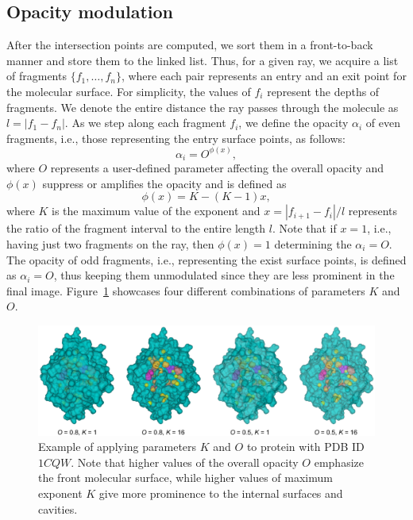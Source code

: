 \subsection{Opacity modulation}\label{sec:opacity}
After the intersection points are computed, we sort them in a front-to-back manner and store them to the linked list. 
Thus, for a given ray, we acquire a list of fragments $\{f_1,\ldots,f_n \}$, where each pair represents an entry and an exit point for the molecular surface. For simplicity, the values of $f_i$ represent the depths of fragments. 
We denote the entire distance the ray passes through the molecule as $l=|f_1-f_n|$. 
As we step along each fragment $f_i$, we define the opacity $\alpha_i$ of even fragments, i.e., those representing the entry surface points, as follows:
\begin{equation}
  \alpha_i = O^{\phi(x)},
	\label{eq:alphaDistEven}
\end{equation}	
where $O$ represents a user-defined parameter affecting the overall opacity and $\phi(x)$ suppress or amplifies the opacity and is defined as
\begin{equation}
  \phi(x) = K-(K-1)x,
	\label{eq:exponent}
\end{equation}	
where $K$ is the maximum value of the exponent and $x=|f_{i+1}-f_i|/l$ represents the ratio of the fragment interval to the entire length $l$. Note that if $x=1$, i.e., having just two fragments on the ray, then $\phi(x)=1$ determining the $\alpha_i=O$. The opacity of odd fragments, i.e., representing the exist surface points, is defined as $\alpha_i = O$, thus keeping them unmodulated since they are less prominent in the final image.
Figure~\ref{fig:Oparam} showcases four different combinations of parameters $K$ and $O$.
\begin{figure}[htb]
  \centering
  \includegraphics[width=\textwidth]{image/Oparam2.pdf}
  \caption{Example of applying parameters $K$ and $O$ to protein with PDB ID $1CQW$. Note that higher values of the overall opacity $O$ emphasize the front molecular surface, while higher values of maximum exponent $K$ give more prominence to the internal surfaces and cavities.}
	\label{fig:Oparam}
\end{figure}

